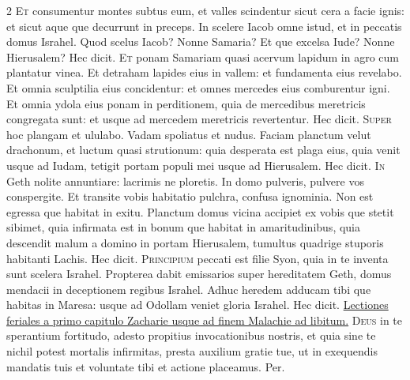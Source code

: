 \begin{multicols*}{2}
\lettrine[lines=2]{\zallmancaps \color{Blue} E}{t} consumentur montes subtus eum, et valles scindentur sicut cera a facie ignis: et sicut aque que decurrunt in preceps. In scelere Iacob omne istud, et in peccatis domus Israhel. Quod scelus Iacob? Nonne Samaria? Et que excelsa Iude? Nonne Hierusalem? Hec dicit.
\lettrine[lines=2]{\zallmancaps \color{Red} E}{t} ponam Samariam quasi acervum lapidum in agro cum plantatur vinea. Et detraham lapides eius in vallem: et fundamenta eius revelabo. Et omnia sculptilia eius concidentur: et omnes mercedes eius comburentur igni. Et omnia ydola eius ponam in perditionem, quia de mercedibus meretricis congregata sunt: et usque ad mercedem meretricis revertentur. Hec dicit.
\lettrine[lines=2]{\zallmancaps \color{Blue} S}{uper} hoc plangam et ululabo. Vadam spoliatus et nudus. Faciam planctum velut drachonum, et luctum quasi strutionum: quia desperata est plaga eius, quia venit usque ad Iudam, tetigit portam populi mei usque ad Hierusalem. Hec dicit.
\lettrine[lines=2]{\zallmancaps \color{Red} I}{n} Geth nolite annuntiare: lacrimis ne ploretis. In domo pulveris, pulvere vos conspergite. Et transite vobis habitatio pulchra, confusa ignominia. Non est egressa que habitat in exitu. Planctum domus vicina accipiet ex vobis que stetit sibimet, quia infirmata est in bonum que habitat in amaritudinibus, quia descendit malum a domino in portam Hierusalem, tumultus quadrige stuporis habitanti Lachis. Hec dicit.
\lettrine[lines=2]{\zallmancaps \color{Blue} P}{rincipium} peccati est filie Syon, quia in te inventa sunt scelera Israhel. Propterea dabit emissarios super hereditatem Geth, domus mendacii in deceptionem regibus Israhel. Adhuc heredem adducam tibi que habitas in Maresa: usque ad Odollam veniet gloria Israhel. Hec dicit.
\newline \ul{Lectiones feriales a primo capitulo Zacharie usque ad finem Malachie ad libitum.}
{\color{Red} }
\lettrine[lines=2]{\zallmancaps \color{Red} D}{eus} in te sperantium fortitudo, adesto propitius invocationibus nostris, et quia sine te nichil potest mortalis infirmitas, presta auxilium gratie tue, ut in exequendis mandatis tuis et voluntate tibi et actione placeamus. Per.

\end{multicols*}
